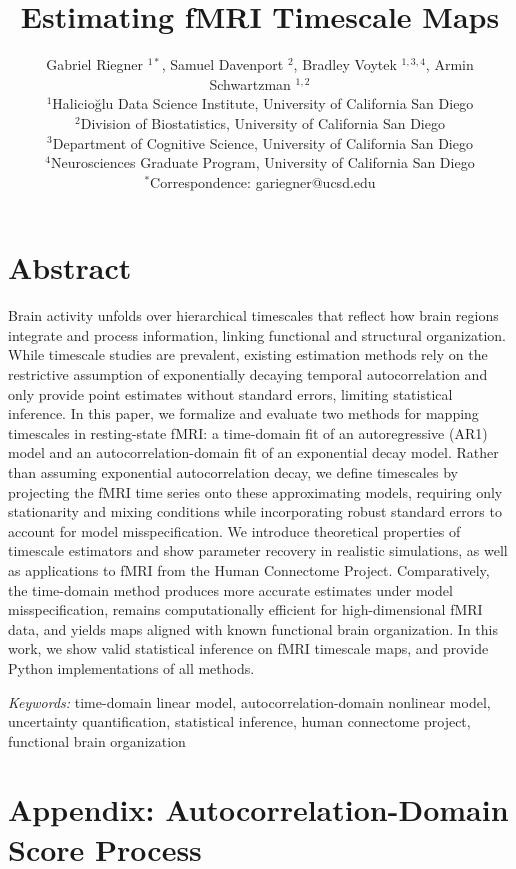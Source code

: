 \documentclass[9pt]{article}
\title{Estimating fMRI Timescale Maps}
\author{Gabriel Riegner $^{1\ast}$, Samuel Davenport $^{2}$, Bradley Voytek $^{1,3,4}$, Armin Schwartzman $^{1,2}$\\
{\small $^{1}$Halicio\u{g}lu Data Science Institute, University of California San Diego}\\
{\small $^{2}$Division of Biostatistics, University of California San Diego}\\
{\small $^{3}$Department of Cognitive Science, University of California San Diego}\\
{\small $^{4}$Neurosciences Graduate Program, University of California San Diego}\\
{\small $^\ast$Correspondence:  gariegner@ucsd.edu}
}
\date{}
\begin{document}
\maketitle

\section*{Abstract}
Brain activity unfolds over hierarchical timescales that reflect how brain regions integrate and process information, linking functional and structural organization. While timescale studies are prevalent, existing estimation methods rely on the restrictive assumption of exponentially decaying temporal autocorrelation and only provide point estimates without standard errors, limiting statistical inference. In this paper, we formalize and evaluate two methods for mapping timescales in resting-state fMRI: a time-domain fit of an autoregressive (AR1) model and an autocorrelation-domain fit of an exponential decay model. Rather than assuming exponential autocorrelation decay, we define timescales by projecting the fMRI time series onto these approximating models, requiring only stationarity and mixing conditions while incorporating robust standard errors to account for model misspecification. We introduce theoretical properties of timescale estimators and show parameter recovery in realistic simulations, as well as applications to fMRI from the Human Connectome Project. Comparatively, the time-domain method produces more accurate estimates under model misspecification, remains computationally efficient for high-dimensional fMRI data, and yields maps aligned with known functional brain organization. In this work, we show valid statistical inference on fMRI timescale maps, and provide Python implementations of all methods.

\vfill
\noindent\textit{Keywords:} time-domain linear model, autocorrelation-domain nonlinear model, uncertainty quantification, statistical inference, human connectome project, functional brain organization
\thispagestyle{empty}
\newpage
\setcounter{page}{1}







\section*{Appendix: Autocorrelation-Domain Score Process}
\end{document}
